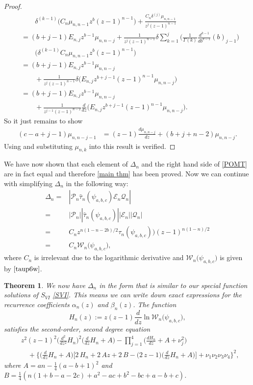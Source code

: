 \documentclass[12pt]{article}
\newtheorem{mydef}{Theorem}[section]
\numberwithin{figure}{section}
\numberwithin{equation}{section}
\numberwithin{table}{section}
\begin{document}
\begin{proof}
\begin{align*}
&\qquad{\delta^{(k-1)}\big(C_{n}\mu_{n,n-1}z^b(z-1)^{n-1}\big)}+\frac{C_n\delta^{(j)}\mu_{n,n-1}}{z^{j}(z-1)^{n-1}}\\
&=(b+j-1)E_{n,j}z^{b-1}\mu_{n,n-j}\!+\!\frac{1}{z^{j}(z-1)^{n-1}}\delta\sum^{j}_{k=1}{\bigg(\frac{1}{\Gamma(k)}\frac{d^{k-1}}{db^{k-1}}(b)_{j-1}\bigg)}\\
&\qquad{\big(\delta^{(k-1)}C_{n}\mu_{n,n-1}z^b(z-1)^{n-1}\big)}\\
&=(b+j-1)E_{n,j}z^{b-1}\mu_{n,n-j}\\
&\qquad+\frac{1}{z^{j}(z-1)^{n-1}}\delta\big(E_{n,j}z^{b+j-1}(z-1)^{n-1}\mu_{n,n-j}\big)\\
&=(b+j-1)E_{n,j}z^{b-1}\mu_{n,n-j}\\
&\qquad+\frac{1}{z^{j-1}(z-1)^{n-2}}\frac{d}{dz}\big(E_{n,j}z^{b+j-1}(z-1)^{n-1}\mu_{n,n-j}\big).
\end{align*}
So it just remains to show
\begin{align*}
(c-a+j-1)\mu_{n,n-j-1}&=(z-1)\frac{d\mu_{n,n-j}}{dz}+(b+j+n-2)\mu_{n,n-j}.
\end{align*}
Using \cite[\S15.5.1]{DLMF} and substituting $\mu_{n,k}$ into \cite[\S15.5.13]{DLMF} this result is verified.
\end{proof}
We have now shown that each element of $\Delta_n$ and the right hand side of \eqref{POMT} are in fact equal and therefore \eqref{main thm} has been proved. Now we can continue with simplifying $\Delta_n$ in the following way:
\begin{align*}
\Delta_n=&|\mathcal{P}_n\hat\tau_n(\psi_{a,b,c})\mathcal{E}_n\mathcal{Q}_n|\\
=&|\mathcal{P}_n||\hat\tau_n(\psi_{a,b,c})||\mathcal{E}_n||\mathcal{Q}_n|\\
=&C_nz^{n(1-n-2b)/2}\tau_n(\psi_{a,b,c}))(z-1)^{n(1-n)/2}\\
=&C_n\mathcal{W}_n\big(\psi_{a,b,c}\big),
\end{align*}
where $C_n$ is irrelevant due to the logarithmic derivative and $\mathcal{W}_n\big(\psi_{a,b,c}\big)$ is given by $\eqref{taup6w}$.
\begin{mydef}
We now have $\Delta_n$ in the form that is similar to our special function solutions of $S_{VI}$ \eqref{SVI}. This means we can write down exact expressions for the recurrence coefficients $\alpha_n(z)$ and $\beta_n(z)$.
The function
\begin{equation}
H_n(z):=z(z-1)\frac{d}{dz}\ln \mathcal{W}_n\big(\psi_{a,b,c}\big), \label{H_n}
\end{equation}
satisfies the second-order, second degree equation
\begin{align}\nonumber
&{z}^{2}(z-1)^{2}\bigg({\frac {d^{2}}{d{z}^{2}}}H_n\bigg)^{2}\bigg({\frac {d}{dz}}H_n+A\bigg)-\prod^4_{j=1}\bigg(\frac{dH_n}{dz}+A+\nu_j^2\bigg)\\
&\quad +\!\bigg\{\bigg({\frac {d}{dz}}H_n+A\bigg)\bigg[2\,H_n+2\,Az+2\,B-\big( 2\,z-1\big)\bigg({\frac{d}{dz}}H_n+A\bigg)\bigg]\!+\nu_{{1}}\nu_{{2}}\nu_{{3}}\nu_{{4}}\bigg\}^{2},\label{HeqP6}
\end{align}
where $A=an-\tfrac{1}{4}(a-b+1)^2$ and $B=\tfrac{1}{4}(n(1+b-a-2c)+a^2-ac+b^2-bc+a-b+c)$.
\end{mydef}
\end{document}

